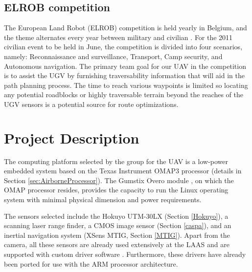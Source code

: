 \documentclass[a4paper,11pt]{report}
\begin{document}
\section{ELROB competition}

The European Land Robot (ELROB) competition is held yearly in Belgium, and the theme alternates every year between military and civilian \cite{elrob}. For the 2011 civilian event to be held in June, the competition is divided into four scenarios, namely: Reconnaissance and surveillance, Transport, Camp security, and Autonomous navigation. The primary team goal for our UAV in the competition is to assist the UGV by furnishing traversability information that will aid in the path planning process. The time to reach various waypoints is limited so locating any potential roadblocks or highly traversable terrain beyond the reaches of the UGV sensors is a potential source for route optimizations.

\chapter{Project Description}

The computing platform selected by the group for the UAV is a low-power embedded system based on the Texas Instrument OMAP3 processor (details in Section \ref{sec:AirborneProcessor}). The Gumstix Overo module \cite{Overo}, on which the OMAP processor resides, provides the capacity to run the Linux operating system with minimal physical dimension and power requirements. 

The sensors selected include the Hokuyo UTM-30LX (Section \ref{Hokuyo}), a scanning laser range finder, a CMOS image sensor (Section \ref{caspa}), and an inertial navigation system (XSens MTIG, Section \ref{MTIG}). Apart from the camera, all these sensors are already used extensively at the LAAS and are supported with custom driver software \cite{robotpkg}. Furthermore, these drivers have already been ported for use with the ARM processor architecture.

\begin{figure}[htb]
  \centering
  \caption{}
  \label{fig:sensors}
\end{figure}
\end{document}
